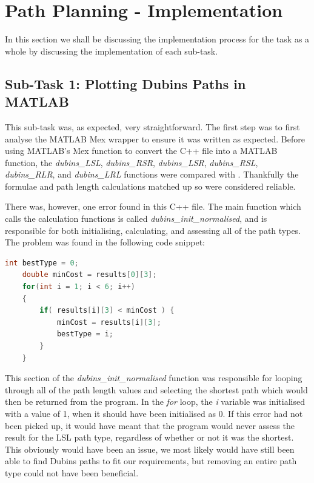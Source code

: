 \section{Path Planning - Implementation}
\label{task1:implementation}

In this section we shall be discussing the implementation process for the task as a whole by discussing the implementation of each sub-task. 

\subsection{Sub-Task 1: Plotting Dubins Paths in MATLAB}
\label{task1:implementation:subtask1}

This sub-task was, as expected, very straightforward. The first step was to first analyse the MATLAB Mex wrapper to ensure it was written as expected. Before using MATLAB's Mex function to convert the C++ file into a MATLAB function, the \textit{dubins\_LSL}, \textit{dubins\_RSR}, \textit{dubins\_LSR}, \textit{dubins\_RSL}, \textit{dubins\_RLR}, and \textit{dubins\_LRL} functions were compared with \cite{shkel2001classification}. Thankfully the formulae and path length calculations matched up so were considered reliable. 

There was, however, one error found in this C++ file. The main function which calls the calculation functions is called \textit{dubins\_init\_normalised}, and is responsible for both initialising, calculating, and assessing all of the path types. The problem was found in the following code snippet: 

\begin{minipage}{\linewidth}
\begin{lstlisting}[language=C++]
    int bestType = 0;
    double minCost = results[0][3];
    for(int i = 1; i < 6; i++) 
    {
        if( results[i][3] < minCost ) {
            minCost = results[i][3];
            bestType = i;
        } 
    }
\end{lstlisting}
\end{minipage}

This section of the \textit{dubins\_init\_normalised} function was responsible for looping through all of the path length values and selecting the shortest path which would then be returned from the program. In the \textit{for} loop, the \textit{i} variable was initialised with a value of 1, when it should have been initialised as 0. If this error had not been picked up, it would have meant that the program would never assess the result for the LSL path type, regardless of whether or not it was the shortest. This obviously would have been an issue, we most likely would have still been able to find Dubins paths to fit our requirements, but removing an entire path type could not have been beneficial. 


